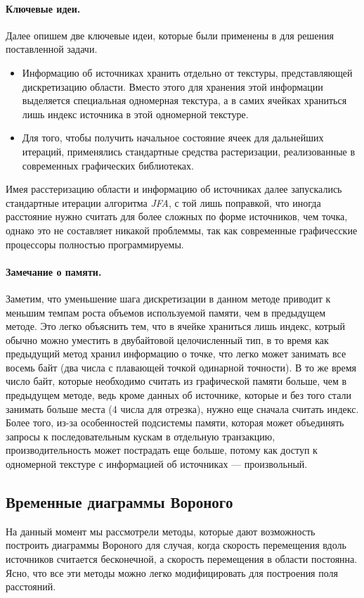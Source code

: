 \documentclass[12pt]{article}
\begin{document}
\paragraph{Ключевые идеи.} Далее опишем две ключевые идеи, которые были 
применены в \cite{gvd} для решения поставленной задачи.
\begin{itemize}
\item Информацию об источниках хранить отдельно от текстуры, представляющей
дискретизацию области. Вместо этого для хранения этой информации выделяется 
специальная одномерная текстура, а в самих ячейках храниться лишь индекс 
источника в этой одномерной текстуре.
\item Для того, чтобы получить начальное состояние ячеек для дальнейших 
итераций, применялись стандартные средства растеризации, реализованные в
современных графических библиотеках.
\end{itemize}

Имея расстеризацию области и информацию об источниках далее запускались
стандартные итерации алгоритма \emph{JFA}, с той лишь поправкой, что
иногда расстояние нужно считать для более сложных по форме источников, чем 
точка, однако это не составляет никакой проблеммы, так как современные
графичесские процессоры полностью программируемы.

\paragraph{Замечание о памяти.} Заметим, что уменьшение шага дискретизации
в данном методе приводит к меньшим темпам роста объемов используемой памяти,
чем в предыдущем методе. Это легко объяснить тем, что в ячейке храниться 
лишь индекс, котрый обычно можно уместить в двубайтовой целочисленный тип, 
в то время как предыдущий метод хранил информацию о точке, что легко может
занимать все восемь байт (два числа с плавающей точкой одинарной точности).
В то же время число байт, которые необходимо считать из графической памяти 
больше, чем в предыдущем методе, ведь кроме данных об источнике, которые
и без того стали занимать больше места (4 числа для отрезка), нужно еще 
сначала считать индекс. Более того, из-за особенностей подсистемы памяти,
которая может объединять запросы к последовательным кускам в отдельную 
транзакцию, производительность может пострадать еще больше, потому как 
доступ к одномерной текстуре с информацией об источниках --- произвольный.

\subsection{Временные диаграммы Вороного}
На данный момент мы рассмотрели методы, которые дают возможность построить
диаграммы Вороного для случая, когда скорость перемещения вдоль источников
считается бесконечной, а скорость перемещения в области постоянна. Ясно, что
все эти методы можно легко модифицировать для построения поля расстояний.
\end{document}
